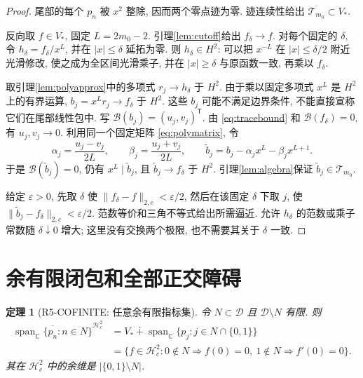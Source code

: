 \documentclass[UTF8,fontset=fandol,11pt,a4paper]{ctexart}
\newtheorem{theorem}{定理}[section]
\theoremstyle{definition}
\newcommand{\C}{\mathbb C}
\newcommand{\Hc}{\mathcal H_c^2}
\newcommand{\spn}{\operatorname{span}_{\C}}
\newcommand{\norm}[1]{\lVert #1\rVert}
\newcommand{\Bc}{\mathcal B}
\begin{document}
\begin{proof}
尾部的每个 $p_n$ 被 $x^2$ 整除, 因而两个零点迹为零.
迹连续性给出 $\overline{\mathcal T_{m_0}}\subset V_*$.

反向取 $f\in V_*$, 固定 $L=2m_0-2$.
引理\ref{lem:cutoff}给出 $f_\delta\to f$.
对每个固定的 $\delta$, 令 $h_\delta=f_\delta/x^L$,
并在 $|x|\le\delta$ 延拓为零. 则 $h_\delta\in H^2$:
可以把 $x^{-L}$ 在 $|x|\le\delta/2$ 附近光滑修改, 使之成为全区间光滑乘子,
并在 $|x|\ge\delta$ 与原函数一致, 再乘以 $f_\delta$.

取引理\ref{lem:polyapprox}中的多项式 $r_j\to h_\delta$ 于 $H^2$.
由于乘以固定多项式 $x^L$ 是 $H^2$ 上的有界运算,
$b_j=x^Lr_j\to f_\delta$ 于 $H^2$.
这些 $b_j$ 可能不满足边界条件, 不能直接宣称它们在尾部线性包中.
写 $\Bc(b_j)=(u_j,v_j)^{\mathsf T}$.
由 \eqref{eq:tracebound} 和 $\Bc(f_\delta)=0$, 有 $u_j,v_j\to0$.
利用同一个固定矩阵 \eqref{eq:polymatrix}, 令
\begin{equation}\label{eq:correction}
\alpha_j=\frac{u_j-v_j}{2L},\qquad
\beta_j=\frac{u_j+v_j}{2L},\qquad
\widetilde b_j=b_j-\alpha_jx^L-\beta_jx^{L+1}.
\end{equation}
于是 $\Bc(\widetilde b_j)=0$, 仍有 $x^L\mid\widetilde b_j$,
且 $\widetilde b_j\to f_\delta$ 于 $H^2$.
引理\ref{lem:algebra}保证 $\widetilde b_j\in\mathcal T_{m_0}$.

给定 $\varepsilon>0$, 先取 $\delta$ 使 $\norm{f_\delta-f}_{2,c}<\varepsilon/2$,
然后在该固定 $\delta$ 下取 $j$, 使
$\norm{\widetilde b_j-f_\delta}_{2,c}<\varepsilon/2$.
范数等价和三角不等式给出所需逼近.
允许 $h_\delta$ 的范数或乘子常数随 $\delta\downarrow0$ 增大;
这里没有交换两个极限, 也不需要其关于 $\delta$ 一致.
\end{proof}

\section{余有限闭包和全部正交障碍}
\label{sec:cofinite}

\begin{theorem}[R5-COFINITE: 任意余有限指标集]\label{thm:cofinite}
令 $N\subset\mathcal D$ 且 $\mathcal D\setminus N$ 有限. 则
\begin{equation}\label{eq:mainclosure}
\boxed{\begin{aligned}
\overline{\spn\{p_n:n\in N\}}^{\Hc}
&=V_*\mathbin{\dotplus}\spn\{p_j:j\in N\cap\{0,1\}\}\\
&=\{f\in\Hc:0\notin N\Rightarrow f(0)=0,\ 
1\notin N\Rightarrow f'(0)=0\}.
\end{aligned}}
\end{equation}
其在 $\Hc$ 中的余维是 $|\{0,1\}\setminus N|$.
\end{theorem}
\end{document}
